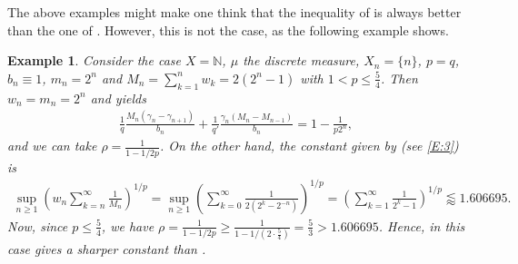 \documentclass[oneside,10pt]{article}          %
\newtheorem{example}[thm]{Example}
\numberwithin{equation}{section}
\begin{document}


The above examples might make one think that the inequality of  is always better than the one of \cite[Theorem 1]{Bouthat2023}. However, this is not the case, as the following example shows.

\begin{example}
    Consider the case $X=\mathbb{N}$, $\mu$ the discrete measure, $X_n=\{n\}$, $p=q$, $b_n\equiv 1$, $m_n=2^n$ and $M_n=\sum_{k=1}^n w_k = 2(2^n-1)$ with $1<p\leq \frac{5}{4}$. Then $w_n=m_n=2^n$ and  yields 
    \begin{align*}
        \frac{1}{q}\frac{M_n(\gamma_n-\gamma_{n+1})}{b_n}
    +\frac{1}{q'}\frac{\gamma_n(M_n-M_{n-1})}{b_n}  = 1-\frac{1}{p2^{n}},
    \end{align*}
    and we can take $\rho = \frac{1}{1-1/2p}$. On the other hand, the constant given by \cite[Theorem 1]{Bouthat2023} (see \eqref{E:3}) is
    \begin{align*}
        \sup_{n\geq 1} \left(w_n\sum_{k=n}^\infty \frac{1}{M_n} \right)^{\!\!1/p}\!\! = \sup_{n\geq 1} \left(\sum_{k=0}^\infty \frac{1}{2(2^{k}-2^{-n})} \right)^{\!\!1/p}\!\! = \left(\sum_{k=1}^\infty \frac{1}{2^{k}-1}\right)^{\!\!1/p}\! \lessapprox 1.606695.
    \end{align*}
    Now, since $p\leq \frac{5}{4}$, we have $\rho = \frac{1}{1-1/2p} \geq \frac{1}{1-1/(2\cdot \frac{5}{4})} = \frac{5}{3} > 1.606695$. Hence, in this case \cite[Theorem 1]{Bouthat2023} gives a sharper constant than .
\end{example}
\end{document}
